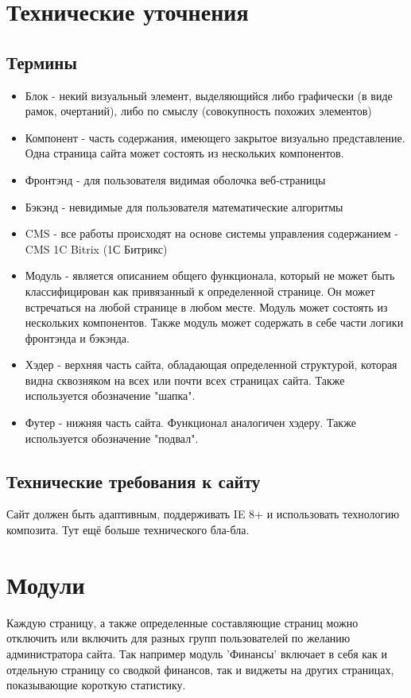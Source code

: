 \documentclass[DIV=calc, paper=a4, fontsize=11pt]{scrartcl} %
\begin{document}
\section{Технические уточнения}

\subsection{Термины}

        \begin{itemize}
        \item Блок - некий визуальный элемент, выделяющийся либо графически (в виде рамок, очертаний), либо по смыслу (совокупность похожих элементов)
        \item Компонент - часть содержания, имеющего закрытое визуально представление. Одна страница сайта может состоять из нескольких компонентов.
        \item Фронтэнд - для пользователя видимая оболочка веб-страницы
        \item Бэкэнд - невидимые для пользователя математические алгоритмы
        \item CMS - все работы происходят на основе системы управления содержанием - CMS 1C Bitrix (1С Битрикс)
        \item Модуль - является описанием общего функционала, который не может быть классифицирован как привязанный к определенной странице. Он может встречаться на любой странице в любом месте. Модуль может состоять из нескольких компонентов. Также модуль может содержать в себе части логики фронтэнда и бэкэнда.
        \item Хэдер - верхняя часть сайта, обладающая определенной структурой, которая видна сквозняком на всех или почти всех страницах сайта. Также используется обозначение "шапка".
        \item Футер - нижняя часть сайта. Функционал аналогичен хэдеру. Также используется обозначение "подвал".
    \end{itemize}


\subsection{Технические требования к сайту}
Сайт должен быть адаптивным, поддерживать IE 8+ и использовать технологию композита.
Тут ещё больше технического бла-бла.


\section{Модули}
Каждую страницу, а также определенные составляющие страниц можно отключить или включить для разных групп пользователей по желанию администратора сайта. Так например модуль 'Финансы' включает в себя как и отдельную страницу со сводкой финансов, так и виджеты на других страницах, показывающие короткую статистику.
\end{document}
